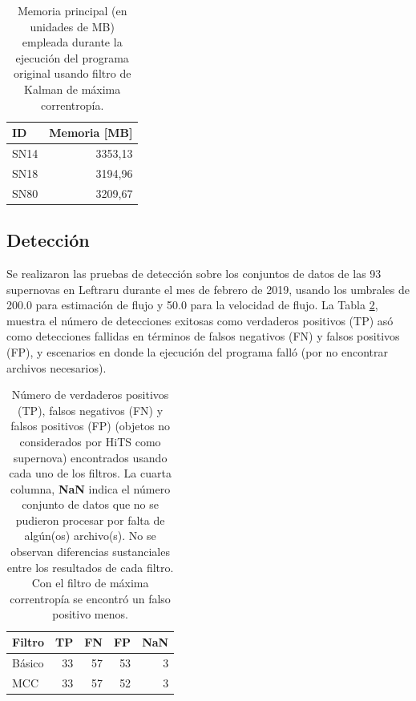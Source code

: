 \begin{table}[h!]
\centering
\caption{Memoria principal (en unidades de MB) empleada durante la ejecuci\'on del programa original usando filtro de Kalman de m\'axima correntrop\'ia.}
\begin{tabular}{|l|r|}
\hline
\textbf{ID} & Memoria [MB]\\\hline\hline
SN14 & 3353,13\\\hline
SN18 & 3194,96\\\hline
SN80 & 3209,67\\\hline
\end{tabular}
\label{tab:mem2}
\end{table}

\subsection{Detecci\'on}
Se realizaron las pruebas de detecci\'on sobre los conjuntos de datos de las 93 supernovas en Leftraru durante el mes de febrero de 2019, usando los  umbrales de 200.0 para estimaci\'on de flujo y 50.0 para la velocidad de flujo. La Tabla \ref{tab:tpfn}, muestra el n\'umero de detecciones exitosas como verdaderos positivos (TP) as\'o como detecciones fallidas en t\'erminos de falsos negativos (FN) y falsos positivos (FP), y escenarios en donde la ejecuci\'on del programa fall\'o (por no encontrar archivos necesarios). 
\bigskip

\begin{table}[h!]
\centering
\caption{N\'umero de verdaderos positivos (TP), falsos negativos (FN) y falsos positivos (FP) (objetos no considerados por HiTS como supernova) encontrados usando cada uno de los filtros. La cuarta columna, \textbf{NaN} indica el n\'umero conjunto de datos que no se pudieron procesar por falta de alg\'un(os) archivo(s). No se observan diferencias sustanciales entre los resultados de cada filtro. Con el filtro de m\'axima correntrop\'ia se encontr\'o un falso positivo menos.}
\begin{tabular}{|l|r|r|r|r|}
\hline
\textbf{Filtro} & \textbf{TP} & \textbf{FN} & \textbf{FP}  & \textbf{NaN}\\ \hline
Básico          & 33          & 57         & 53 & 3 \\ \hline
MCC             & 33          & 57         & 52 & 3 \\ \hline
\end{tabular}
\label{tab:tpfn}
\end{table}

